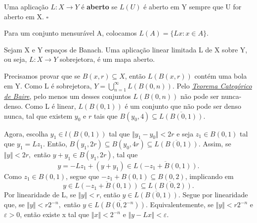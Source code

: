 \documentclass[measure_theory.tex]{subfiles}
\begin{document}
\begin{def*}
	Uma aplicação \(L:X\rightarrow Y\) é \textbf{aberto} se \(L(U)\) é aberto em Y sempre que U for aberto em X. \(\square\)
\end{def*}
Para um conjunto mensurável A, colocamos \(L(A) = \{Lx: x \in A\}\).
\hypertarget{open_mapping}{
	\begin{theorem*}
		Sejam X e Y espaços de Banach. Uma aplicação linear limitada L de X sobre Y, ou seja, \(L:X\rightarrow Y\) sobrejetora, é um mapa aberto.
	\end{theorem*}
}
\begin{proof*}
	Precisamos provar que se \(B(x, r)\subseteq X\), então \(L(B(x, r))\) contém uma bola em Y. Como L é sobrejetora, \(Y = \bigcup_{n=1}^{\infty}L(B(0, n))\). Pelo \hyperlink{baire_category}{\textit{Teorema Categórico de Baire}},
	pelo menos um desses conjuntos \(L(B(0, n))\) não pode ser nunca-denso. Como L é linear, \(L(B(0, 1))\) é um conjunto que não pode ser denso nunca, tal que existem \(y_{0}\) e \(r\) tais que \(B(y_{0}, 4)\subseteq \overline{L(B(0, 1))}\).

	Agora, escolha \(y_1\in l(B(0, 1))\) tal que \(\Vert y_1 - y_{0} \Vert < 2r\) e seja \(z_1\in B(0, 1)\) tal que \(y_1 = Lz_1.\) Então, \(B(y_1, 2r)\subseteq B(y_{0}, 4r)\subseteq \overline{L(B(0, 1))}.\) Assim, se \(\Vert y \Vert < 2r,\) então
	\(y + y_1\in B(y_1, 2r)\), tal que
	\[
		y= -Lz_1 + (y + y_1)\in \overline{L(-z_1 + B(0, 1))}.
	\]
	Como \(z_1\in B(0, 1)\), segue que \(-z_1 + B(0, 1)\subseteq B(0, 2)\), implicando em
	\[
		y\in \overline{L(-z_1 + B(0, 1))}\subseteq \overline{L(B(0, 2))}.
	\]
	Por linearidade de L, se \(\Vert y \Vert < r\), então \(y\in \overline{L(B(0, 1))}.\) Segue por linearidade que, se \(\Vert y \Vert < r2^{-n},\) então \(y\in \overline{L(B(0, 2^{-n}))}.\) Equivalentemente,
	se \(\Vert y \Vert < r2^{-n}\) e \(\varepsilon  > 0\), então existe x tal que \(\Vert x \Vert < 2^{-n} \) e \(\Vert y - Lx \Vert < \varepsilon .\)


\end{proof*}
\end{document}
